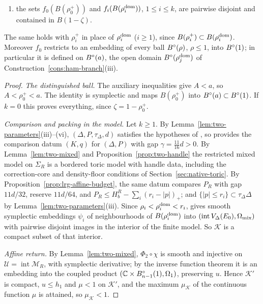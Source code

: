 \begin{theorem}
\begin{enumerate}[label=(\roman*)]
 for $i\ge1$;
\item the sets $f_0(B(\rho_0^+))$ and $f_i(B(\rho_i^{\rm dom}))$, $1\le i\le k$, are pairwise disjoint and contained in $B(1-\zeta)$.
\end{enumerate}
The same holds with $\rho_i^+$ in place of $\rho_i^{\rm dom}$ ($i\ge1$), since $B(\rho_i^+)\subset B(\rho_i^{\rm dom})$. Moreover $f_0$
restricts to an embedding of every ball $B^{\circ}(\rho)$, $\rho\le1$, into $B^{\circ}(1)$; in particular it is defined on
$B^{\circ}(a)$, the open domain $B^{\circ}(\rho_j^{\rm dom})$ of Construction~\ref{cons:ham-branch}(iii).
\end{theorem}

\begin{proof}
\emph{The distinguished ball.} The auxiliary inequalities give $A<a$, so $A<\rho_0^+<a$. The identity is symplectic and
maps $B(\rho_0^+)$ into $B^{\circ}(a)\subset B^{\circ}(1)$. If $k=0$ this proves everything, since $\zeta=1-\rho_0^+$.

\emph{Comparison and packing in the model.} Let $k\ge1$. By Lemma~\ref{lem:two-parameters}(iii)--(vi), $(\Delta,P,\tau_\Delta,d)$
satisfies the hypotheses of , so  provides the comparison datum
$(K,q)$ for $(\Delta,P)$ with gap $\gamma=\frac{11}{16}d>0$. By Lemma~\ref{lem:two-mixed} and Proposition~\ref{prop:two-handle} the
restricted mixed model on $\Sigma_R$ is a bordered toric model with handle data, including the correction-core and
density-floor conditions of Section~\ref{sec:native-toric}. By Proposition~\ref{prop:lrg-affine-budget},
the same datum compares $P_R$ with gap $11d/32$, reserve $11d/64$, and
$P_R\le H_b^R-\sum_i(r_i-|p|)_+$; and $\{|p|\le r_i\}\subset\tau_\Delta\Delta$ by Lemma~\ref{lem:two-parameters}(iii). Since
$\rho_i<\rho_i^{\rm dom}<r_i$,  gives smooth symplectic embeddings $\psi_i$ of
neighbourhoods of $B(\rho_i^{\rm dom})$ into $(\operatorname{int}V_\Delta(E_0),\Omega_{\rm mix})$ with pairwise disjoint images
in the interior of the finite model. So $\mathcal K$ is a compact subset of that interior.

\emph{Affine return.} By Lemma~\ref{lem:two-mixed}, $\Phi_2\circ\chi$ is smooth and injective on $\mathcal U=\operatorname{int}\mathcal M_R$,
with symplectic derivative; by the inverse function theorem it is an embedding into the coupled product
$(\mathbb{C}\times B^{\circ}_{n-1}(1),\Omega_1)$, preserving $u$. Hence $\mathcal K'$ is compact, $u\le h_1$ and $\mu<1$ on $\mathcal K'$, and
the maximum $\mu_{\mathcal K}$ of the continuous function $\mu$ is attained, so $\mu_{\mathcal K}<1$.


\end{proof}
